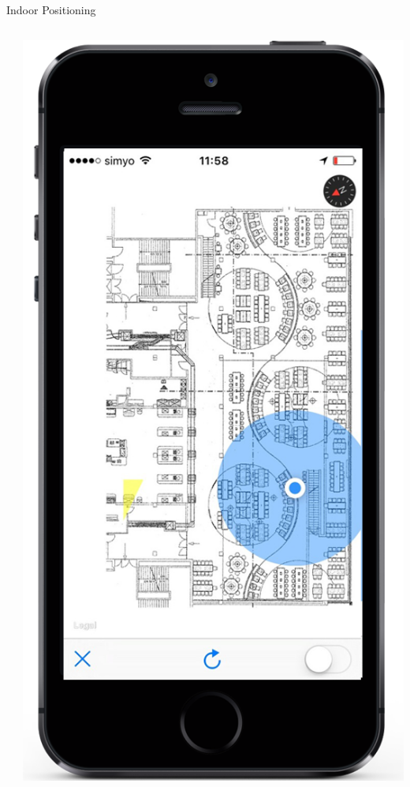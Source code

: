 \documentclass[11pt]{beamer}
\begin{document}
\begin{frame}{Indoor Positioning}
\begin{columns}[T]
\begin{column}{.6\textwidth}
\begin{itemize}
  \end{itemize}
  \end{column}
  \begin{column}{.4\textwidth}
  \includegraphics[scale=0.25]{applesignalweak}
  \end{column}
\end{columns}

\end{frame}
\end{document}
